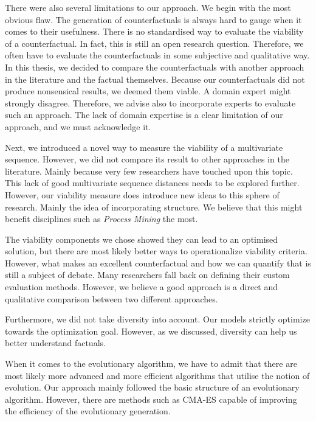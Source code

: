 \documentclass[./../../paper.tex]{subfiles}
\begin{document}
There were also several limitations to our approach. We begin with the most obvious flaw. The generation of counterfactuals is always hard to gauge when it comes to their usefulness. There is no standardised way to evaluate the viability of a counterfactual. In fact, this is still an open research question\autocites{hsieh_DiCE4ELInterpretingProcess_2021,mothilal_ExplainingMachineLearning_2020}. Therefore, we often have to evaluate the counterfactuals in some subjective and qualitative way. In this thesis, we decided to compare the counterfactuals with another approach in the literature and the factual themselves. Because our counterfactuals did not produce nonsensical results, we deemed them viable. A domain expert might strongly disagree. Therefore, we advise also to incorporate experts to evaluate such an approach. The lack of domain expertise is a clear limitation of our approach, and we must acknowledge it. 

Next, we introduced a novel way to measure the viability of a multivariate sequence. However, we did not compare its result to other approaches in the literature. Mainly because very few researchers have touched upon this topic. This lack of good multivariate sequence distances needs to be explored further. However, our viability measure does introduce new ideas to this sphere of research. Mainly the idea of incorporating structure. We believe that this might benefit disciplines such as \emph{Process Mining} the most. 

The viability components we chose showed they can lead to an optimised solution, but there are most likely better ways to operationalize viability criteria. However, what makes an excellent counterfactual and how we can quantify that is still a subject of debate. Many researchers fall back on defining their custom evaluation methods. However, we believe a good approach is a direct and qualitative comparison between two different approaches.

Furthermore, we did not take diversity into account. Our models strictly optimize towards the optimization goal. However, as we discussed, diversity can help us better understand factuals.

When it comes to the evolutionary algorithm, we have to admit that there are most likely more advanced and more efficient algorithms that utilise the notion of evolution. Our approach mainly followed the basic structure of an evolutionary algorithm. However, there are methods such as CMA-ES capable of improving the efficiency of the evolutionary generation. 
\end{document}
